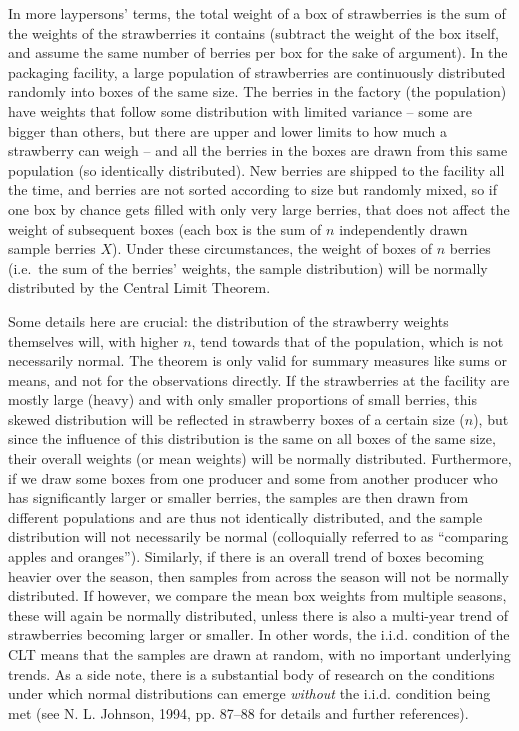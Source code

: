\documentclass[
  12pt,
]{book}
\begin{document}
In more laypersons' terms, the total weight of a box of strawberries is the sum of the weights of the strawberries it contains (subtract the weight of the box itself, and assume the same number of berries per box for the sake of argument). In the packaging facility, a large population of strawberries are continuously distributed randomly into boxes of the same size. The berries in the factory (the population) have weights that follow some distribution with limited variance -- some are bigger than others, but there are upper and lower limits to how much a strawberry can weigh -- and all the berries in the boxes are drawn from this same population (so identically distributed). New berries are shipped to the facility all the time, and berries are not sorted according to size but randomly mixed, so if one box by chance gets filled with only very large berries, that does not affect the weight of subsequent boxes (each box is the sum of \(n\) independently drawn sample berries \(X\)). Under these circumstances, the weight of boxes of \(n\) berries (i.e.~the sum of the berries' weights, the sample distribution) will be normally distributed by the Central Limit Theorem.

Some details here are crucial: the distribution of the strawberry weights themselves will, with higher \(n\), tend towards that of the population, which is not necessarily normal. The theorem is only valid for summary measures like sums or means, and not for the observations directly. If the strawberries at the facility are mostly large (heavy) and with only smaller proportions of small berries, this skewed distribution will be reflected in strawberry boxes of a certain size (\(n\)), but since the influence of this distribution is the same on all boxes of the same size, their overall weights (or mean weights) will be normally distributed. Furthermore, if we draw some boxes from one producer and some from another producer who has significantly larger or smaller berries, the samples are then drawn from different populations and are thus not identically distributed, and the sample distribution will not necessarily be normal (colloquially referred to as ``comparing apples and oranges''). Similarly, if there is an overall trend of boxes becoming heavier over the season, then samples from across the season will not be normally distributed. If however, we compare the mean box weights from multiple seasons, these will again be normally distributed, unless there is also a multi-year trend of strawberries becoming larger or smaller. In other words, the i.i.d. condition of the CLT means that the samples are drawn at random, with no important underlying trends. As a side note, there is a substantial body of research on the conditions under which normal distributions can emerge \emph{without} the i.i.d. condition being met (see N. L. Johnson, 1994, pp. 87--88 for details and further references).
\end{document}
